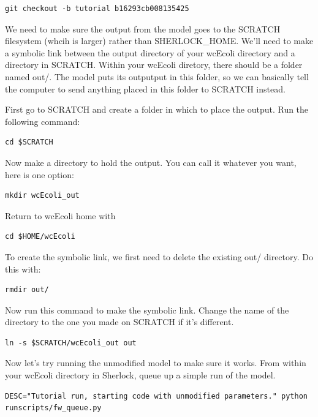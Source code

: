 \documentclass[12pt]{article}
\begin{document}
\lstset{language=bash}
\begin{lstlisting}
git checkout -b tutorial b16293cb008135425
\end{lstlisting}

We need to make sure the output from the model goes to the SCRATCH filesystem (whcih is larger) rather than SHERLOCK\_HOME. We'll need to make a symbolic link between the output directory of your wcEcoli directory and a directory in SCRATCH. Within your wcEcoli diretory, there should be a folder named out/. The model puts its outputput in this folder, so we can basically tell the computer to send anything placed in this folder to SCRATCH instead.

First go to SCRATCH and create a folder in which to place the output. Run the following command:

\lstset{language=bash}
\begin{lstlisting}
cd $SCRATCH
\end{lstlisting}

Now make a directory to hold the output. You can call it whatever you want, here is one option:

\lstset{language=bash}
\begin{lstlisting}
mkdir wcEcoli_out
\end{lstlisting}

Return to wcEcoli home with

\lstset{language=bash}
\begin{lstlisting}
cd $HOME/wcEcoli
\end{lstlisting}

To create the symbolic link, we first need to delete the existing out/ directory. Do this with:

\lstset{language=bash}
\begin{lstlisting}
rmdir out/
\end{lstlisting}

Now run this command to make the symbolic link. Change the name of the directory to the one you made on SCRATCH if it's different.

\lstset{language=bash}
\begin{lstlisting}
ln -s $SCRATCH/wcEcoli_out out
\end{lstlisting}


Now let's try running the unmodified model to make sure it works. From within your wcEcoli directory in Sherlock, queue up a simple run of the model.

\lstset{language=bash}
\begin{lstlisting}
DESC="Tutorial run, starting code with unmodified parameters." python runscripts/fw_queue.py
\end{lstlisting}
\end{document}
